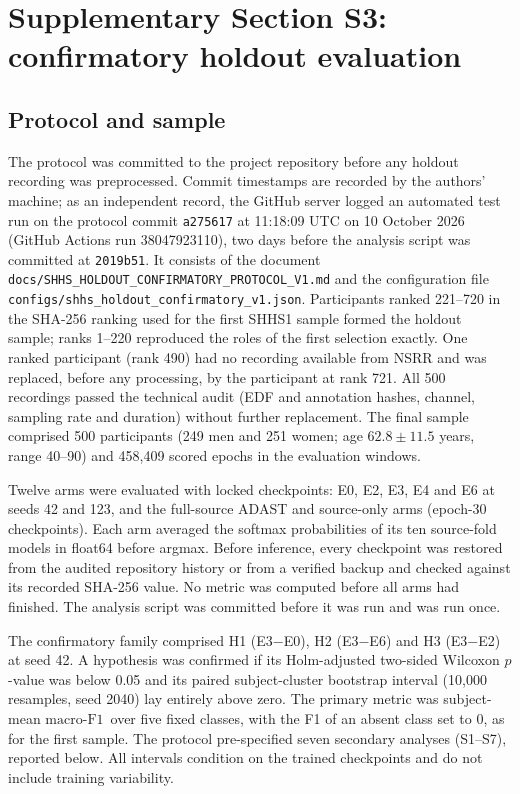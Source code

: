 \documentclass[10pt,a4paper]{article}
\newcommand{\mf}{\ensuremath{\mathrm{macro\text{-}F1}}}
\begin{document}
\section*{Supplementary Section S3: confirmatory holdout evaluation}
\label{sec:sup_holdout}

\subsection*{Protocol and sample}

The protocol was committed to the project repository before any holdout recording was preprocessed.
Commit timestamps are recorded by the authors' machine; as an independent record, the GitHub server
logged an automated test run on the protocol commit \texttt{a275617} at 11:18:09 UTC on 10 October 2026
(GitHub Actions run 38047923110), two days before the analysis script was committed at \texttt{2019b51}. It consists of the document \nolinkurl{docs/SHHS_HOLDOUT_CONFIRMATORY_PROTOCOL_V1.md} and the
configuration file \nolinkurl{configs/shhs_holdout_confirmatory_v1.json}. Participants ranked 221--720 in the SHA-256 ranking used for the first SHHS1 sample
formed the holdout sample; ranks 1--220 reproduced the roles of the first selection exactly. One
ranked participant (rank 490) had no recording available from NSRR and was replaced, before any
processing, by the participant at rank 721. All 500 recordings passed the technical audit (EDF and
annotation hashes, channel, sampling rate and duration) without further replacement. The final
sample comprised 500 participants (249 men and 251 women; age $62.8\pm11.5$ years, range 40--90) and
458{,}409 scored epochs in the evaluation windows.

Twelve arms were evaluated with locked checkpoints: E0, E2, E3, E4 and E6 at seeds 42 and 123, and the
full-source ADAST and source-only arms (epoch-30 checkpoints). Each arm averaged the softmax
probabilities of its ten source-fold models in float64 before argmax. Before inference, every checkpoint
was restored from the audited repository history or from a verified backup and checked against its
recorded SHA-256 value. No metric was computed before all arms had finished. The analysis script was
committed before it was run and was run once.

The confirmatory family comprised H1 (E3$-$E0), H2 (E3$-$E6) and H3 (E3$-$E2) at seed 42. A
hypothesis was confirmed if its Holm-adjusted two-sided Wilcoxon $p$-value was below 0.05 and its
paired subject-cluster bootstrap interval (10{,}000 resamples, seed 2040) lay entirely above zero. The
primary metric was subject-mean \mf\ over five fixed classes, with the F1 of an absent class set to 0,
as for the first sample. The protocol pre-specified seven secondary analyses (S1--S7), reported below.
All intervals condition on the trained checkpoints and do not include training variability.
\end{document}
